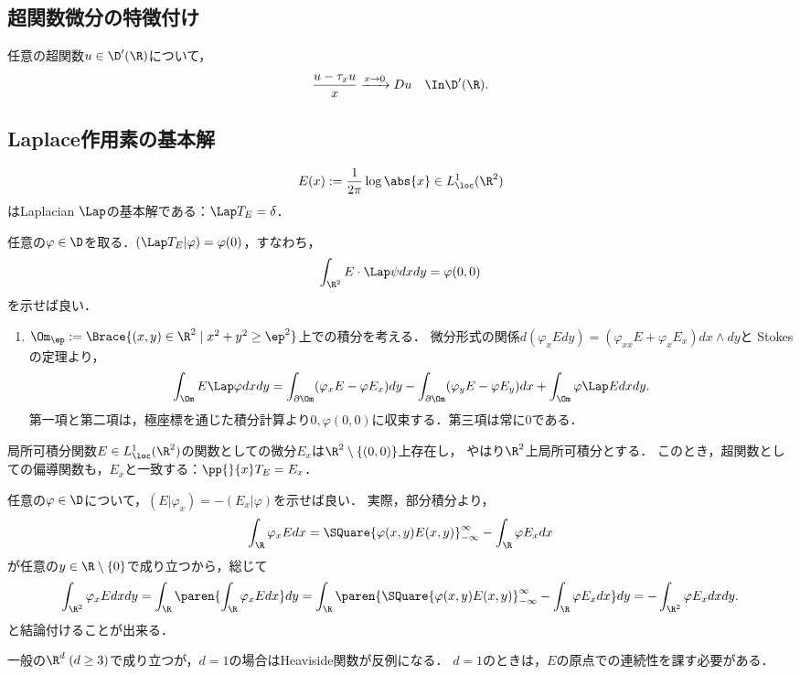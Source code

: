 \documentclass[uplatex,dvipdfmx]{jsreport}
\begin{document}
\subsection{超関数微分の特徴付け}

\begin{proposition}[商の極限としての理解]
    任意の超関数$u\in\D'(\R)$について，
    \[\frac{u-\tau_xu}{x}\xrightarrow{x\to0}Du\quad\In\D'(\R).\]
\end{proposition}

\subsection{Laplace作用素の基本解}

\begin{proposition}[2次元でのLaplacianの基本解]
    \[E(x):=\frac{1}{2\pi}\log\abs{x}\in L^1_\loc(\R^2)\]はLaplacian $\Lap$の基本解である：$\Lap T_E=\delta$．
\end{proposition}
\begin{Proof}
    任意の$\varphi\in\D$を取る．$(\Lap T_E|\varphi)=\varphi(0)$，すなわち，
    \[\int_{\R^2}E\cdot \Lap\psi dxdy=\varphi(0,0)\]
    を示せば良い．
    \begin{enumerate}[{Step}1]
        \item $\Om_\ep:=\Brace{(x,y)\in\R^2\mid x^2+y^2\ge\ep^2}$上での積分を考える．
        微分形式の関係$d(\varphi_xEdy)=(\varphi_{xx}E+\varphi_xE_x)dx\wedge dy$と
        Stokesの定理より，
        \[\int_\Om E\Lap\varphi dxdy=\int_{\partial\Om}(\varphi_xE-\varphi E_x)dy-\int_{\partial\Om}(\varphi_yE-\varphi E_y)dx+\int_\Om\varphi\Lap Edxdy.\]
        第一項と第二項は，極座標を通じた積分計算より$0,\varphi(0,0)$に収束する．第三項は常に$0$である．
    \end{enumerate}
\end{Proof}

\begin{proposition}[状況の抽象化]
    局所可積分関数$E\in L^1_\loc(\R^2)$の関数としての微分$E_x$は$\R^2\setminus\{(0,0)\}$上存在し，
    やはり$\R^2$上局所可積分とする．
    このとき，超関数としての偏導関数も，$E_x$と一致する：$\pp{}{x}T_E=E_x$．
\end{proposition}
\begin{Proof}
    任意の$\varphi\in\D$について，$(E|\varphi_x)=-(E_x|\varphi)$を示せば良い．
    実際，部分積分より，
    \[\int_\R\varphi_xEdx=\SQuare{\varphi(x,y)E(x,y)}^\infty_{-\infty}-\int_\R\varphi E_xdx\]
    が任意の$y\in\R\setminus\{0\}$で成り立つから，総じて
    \[\int_{\R^2}\varphi_xEdxdy=\int_\R\paren{\int_\R\varphi_xEdx}dy=\int_\R\paren{\SQuare{\varphi(x,y)E(x,y)}^\infty_{-\infty}-\int_\R\varphi E_xdx}dy=-\int_{\R^2}\varphi E_xdxdy.\]
    と結論付けることが出来る．
\end{Proof}
\begin{remarks}
    一般の$\R^d\;(d\ge3)$で成り立つが，$d=1$の場合はHeaviside関数が反例になる．
    $d=1$のときは，$E$の原点での連続性を課す必要がある．
\end{remarks}
\end{document}
